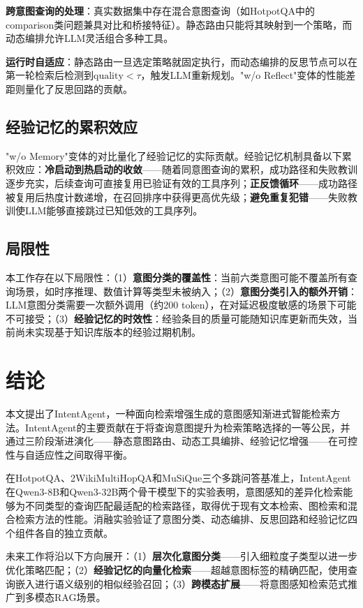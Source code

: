 \documentclass[runningheads]{llncs}
\begin{document}
\textbf{跨意图查询的处理}：真实数据集中存在混合意图查询（如HotpotQA中的comparison类问题兼具对比和桥接特征）。静态路由只能将其映射到一个策略，而动态编排允许LLM灵活组合多种工具。

\textbf{运行时自适应}：静态路由一旦选定策略就固定执行，而动态编排的反思节点可以在第一轮检索后检测到$\text{quality} < \tau$，触发LLM重新规划。"w/o Reflect"变体的性能差距则量化了反思回路的贡献。

\subsection{经验记忆的累积效应}

"w/o Memory"变体的对比量化了经验记忆的实际贡献。经验记忆机制具备以下累积效应：\textbf{冷启动到热启动的收敛}——随着同意图查询的累积，成功路径和失败教训逐步充实，后续查询可直接复用已验证有效的工具序列；\textbf{正反馈循环}——成功路径被复用后热度计数递增，在召回排序中获得更高优先级；\textbf{避免重复犯错}——失败教训使LLM能够直接跳过已知低效的工具序列。

\subsection{局限性}

本工作存在以下局限性：（1）\textbf{意图分类的覆盖性}：当前六类意图可能不覆盖所有查询场景，如时序推理、数值计算等类型未被纳入；（2）\textbf{意图分类引入的额外开销}：LLM意图分类需要一次额外调用（约200 token），在对延迟极度敏感的场景下可能不可接受；（3）\textbf{经验记忆的时效性}：经验条目的质量可能随知识库更新而失效，当前尚未实现基于知识库版本的经验过期机制。

\section{结论}

本文提出了IntentAgent，一种面向检索增强生成的意图感知渐进式智能检索方法。IntentAgent的主要贡献在于将查询意图提升为检索策略选择的一等公民，并通过三阶段渐进演化——静态意图路由、动态工具编排、经验记忆增强——在可控性与自适应性之间取得平衡。

在HotpotQA、2WikiMultiHopQA和MuSiQue三个多跳问答基准上，IntentAgent在Qwen3-8B和Qwen3-32B两个骨干模型下的实验表明，意图感知的差异化检索能够为不同类型的查询匹配最适配的检索路径，取得优于现有文本检索、图检索和混合检索方法的性能。消融实验验证了意图分类、动态编排、反思回路和经验记忆四个组件各自的独立贡献。

未来工作将沿以下方向展开：（1）\textbf{层次化意图分类}——引入细粒度子类型以进一步优化策略匹配；（2）\textbf{经验记忆的向量化检索}——超越意图标签的精确匹配，使用查询嵌入进行语义级别的相似经验召回；（3）\textbf{跨模态扩展}——将意图感知检索范式推广到多模态RAG场景。



\end{document}

